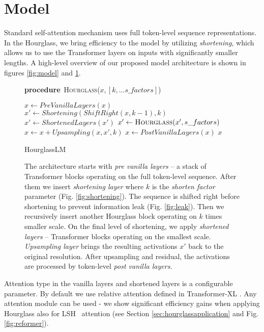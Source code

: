 \documentclass[11pt]{article}
\makeatletter
\newcommand\algorithmicprocedure{\textbf{procedure}}
\newcommand\PROCEDURE[3][default]{\ALC@it
  \algorithmicprocedure\ \textsc{#2}(#3)\begin{ALC@prc}}
\newcommand\ENDPROCEDURE{\end{ALC@prc}}
\newenvironment{ALC@prc}{\begin{ALC@g}}{\end{ALC@g}}
\newcommand{\s}{\emph{shortening}}
\makeatother
\begin{document}
\section{Model}

Standard self-attention mechanism uses full token-level sequence representations. In the Hourglass, we bring efficiency to the model by utilizing \s, which allows us to use the Transformer layers on inputs with significantly smaller lengths. A high-level overview of our proposed model architecture is shown in figures  \ref{fig:model} and \ref{fig:alg}. 

\begin{figure}[ht] 
\begin{algorithm}[H]
\begin{algorithmic}
\PROCEDURE[]{Hourglass}{$x, [k, ...s\_factors]$}
\STATE $x \gets PreVanillaLayers(x)$
\STATE $x' \gets Shortening(ShiftRight(x, k-1), k)$
    \STATE $x' \gets ShortenedLayers(x')$
\ELSE
    \STATE $x' \gets \textsc{Hourglass}(x', s\_factors)$
\ENDIF
\STATE $x \gets x + Upsampling(x, x', k)$
\STATE $x \gets PostVanillaLayers(x) $
\RETURN $x$
\ENDPROCEDURE
\end{algorithmic}
\caption{HourglassLM}
\end{algorithm}
\caption{
The architecture starts with \emph{pre vanilla layers} -- a stack of Transformer blocks operating on the full token-level sequence. After them we insert \emph{shortening layer} where $k$ is the \emph{shorten factor} parameter (Fig. \ref{fig:shortening}). The sequence is shifted right before shortening to prevent information leak (Fig. \ref{fig:leak}). Then we recursively insert another Hourglass block operating on $k$ times smaller scale. On the final level of shortening, we apply \emph{shortened layers} -- Transformer blocks operating on the smallest scale.
\emph{Upsampling layer} brings the resulting activations $x'$ back to the original resolution. After upsampling and residual, the activations are processed by token-level \emph{post vanilla layers}.
}
\label{fig:alg}
\end{figure}

Attention type in the vanilla layers and shortened layers is a configurable parameter. By default we use relative attention defined in Transformer-XL \cite{dai2019transformerxl}. Any attention module can be used - we show significant efficiency gains when applying Hourglass also for LSH~\cite{kitaev2020reformer} attention (see Section \ref{sec:hourglassapplication} and Fig. \ref{fig:reformer}). 
\end{document}
